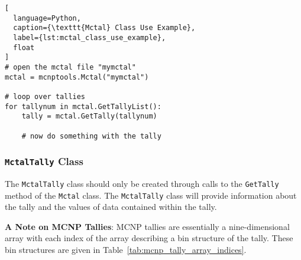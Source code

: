 \documentclass[11pt]{article}
\begin{document}
\begin{lstlisting}[
  language=Python,
  caption={\texttt{Mctal} Class Use Example},
  label={lst:mctal_class_use_example},
  float
]
# open the mctal file "mymctal"
mctal = mcnptools.Mctal("mymctal")

# loop over tallies
for tallynum in mctal.GetTallyList():
    tally = mctal.GetTally(tallynum)

    # now do something with the tally
\end{lstlisting}

\subsubsection{\texttt{MctalTally} Class}\label{the-mctaltally-class}

The \texttt{MctalTally} class should only be created through calls to the
\texttt{GetTally} method of the \texttt{Mctal} class. The \texttt{MctalTally}
class will provide information about the tally and the values of data contained
within the tally.

\textbf{A Note on MCNP Tallies}: MCNP tallies are essentially a nine-dimensional
array with each index of the array describing a bin structure of the tally.
These bin structures are given in Table~\ref{tab:mcnp_tally_array_indices}.
\end{document}
